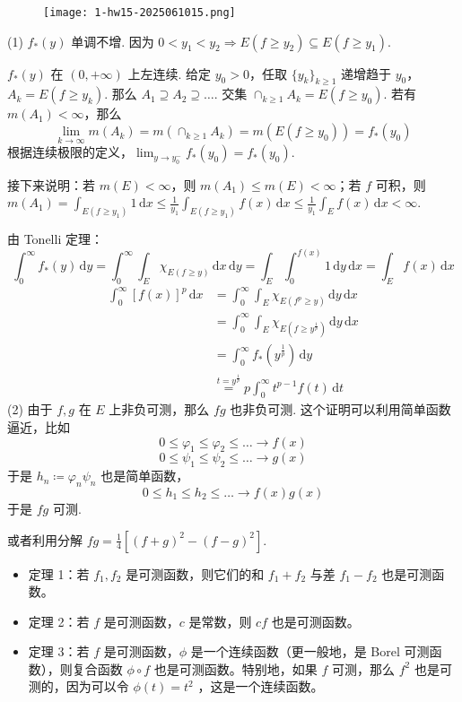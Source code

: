 \begin{exercise}
\begin{figure}[H]
\centering
\texttt{[image: 1-hw15-2025061015.png]}
\label{}
\end{figure}
\end{exercise}
(1)
$f_{*}(y)$ 单调不增. 因为 $0<y_1<y_2\Rightarrow E(f\geq y_2)\subseteq E(f\geq y_1)$.

$f_{*}(y)$ 在 $(0,+\infty)$ 上左连续. 给定 $y_0>0$，任取 $\{ y_k \}_{k\geq1}$ 递增趋于 $y_0$，$A_k=E(f\geq y_k)$. 那么 $A_1\supseteq A_2\supseteq\dots$. 交集 $\cap_{k\geq1}A_k=E(f\geq y_0)$. 若有 $m(A_1)<\infty$，那么
\[
\lim_{ k \to \infty } m(A_k)=m(\cap_{k\geq 1}A_k)=m(E(f\geq y_0))=f_{*}(y_0)
\]
根据连续极限的定义，$\lim_{ y \to y_0^{-} }f_{*}(y_0)=f_{*}(y_0)$.

接下来说明：若 $m(E)<\infty$，则 $m(A_1)\leq m(E)<\infty$；若 $f$ 可积，则 $m(A_1)=\int_{E(f\geq y_1)}^{} 1 \, \mathrm{d}x\leq\frac{1}{y_1}\int_{E(f\geq y_1)}^{} f(x) \, \mathrm{d}x\leq\frac{1}{y_1}\int_{E}^{} f(x) \, \mathrm{d}x<\infty$.

由 Tonelli 定理：
\[
\int_{0}^{\infty} f_{*}(y) \, \mathrm{d}y =\int_{0}^{\infty} \int_{E}^{} \chi_{E(f\geq y)} \, \mathrm{d}x  \, \mathrm{d}y=\int_{E}^{} \int_{0}^{f(x)} 1 \, \mathrm{d}y \, \mathrm{d}x =\int_{E}^{} f(x) \, \mathrm{d}x
\]
\[
\begin{aligned}
\int_{0}^{\infty} [f(x)]^{p} \, \mathrm{d}x  & =\int_{0}^{\infty} \int_{E}^{} \chi_{E(f^{p}\geq  y)} \, \mathrm{d}y  \, \mathrm{d}x  \\
 & =\int_{0}^{\infty} \int_{E}^{}\chi_{E\left( f\geq y^{\frac{1}{p}} \right)}  \, \mathrm{d}y  \, \mathrm{d}x  \\
 & =\int_{0}^{\infty} f_{*}\left( y^{\frac{1}{p}} \right) \, \mathrm{d}y \\
 & \overset{ t=y^{\frac{1}{p}} }{ = }p\int_{0}^{\infty} t^{p-1}f(t) \, \mathrm{d}t 
\end{aligned}
\]
(2)
由于 $f,g$ 在 $E$ 上非负可测，那么 $fg$ 也非负可测. 这个证明可以利用简单函数逼近，比如
\[
0\leq \varphi_1\leq \varphi_2\leq \dots\to f(x)
\]
\[
0\leq \psi_1\leq \psi_2\leq \dots\to g(x)
\]
于是 $h_n\coloneqq\varphi _n\psi _n$ 也是简单函数，
\[
0\leq h_1\leq h_2\leq \dots\to f(x)g(x)
\]
于是 $fg$ 可测.

或者利用分解 $fg=\frac{1}{4}[(f+g)^{2}-(f-g)^{2}]$.

\begin{itemize}
	\item 定理 1：若 $f_1, f_2$ 是可测函数，则它们的和 $f_1+f_2$ 与差 $f_1-f_2$ 也是可测函数。
	\item 定理 2：若 $f$ 是可测函数，$c$ 是常数，则 $c f$ 也是可测函数。
	\item 定理 3：若 $f$ 是可测函数，$\phi$ 是一个连续函数（更一般地，是 Borel 可测函数），则复合函数 $\phi \circ f$ 也是可测函数。特别地，如果 $f$ 可测，那么 $f^2$ 也是可测的，因为可以令 $\phi(t)=t^2$ ，这是一个连续函数。
\end{itemize}

